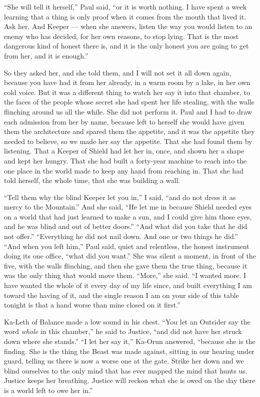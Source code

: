 ``She will tell it herself,'' Paul said, ``or it is worth nothing. I have spent a week learning that a thing is only proof when it comes from the mouth that lived it. Ask her. And Keeper --- when she answers, listen the way you would listen to an enemy who has decided, for her own reasons, to stop lying. That is the most dangerous kind of honest there is, and it is the only honest you are going to get from her, and it is enough.''\par

So they asked her, and she told them, and I will not set it all down again, because you have had it from her already, in a warm room by a lake, in her own cold voice. But it was a different thing to watch her say it into that chamber, to the faces of the people whose secret she had spent her life stealing, with the walls flinching around us all the while. She did not perform it. Paul and I had to draw each admission from her by name, because left to herself she would have given them the architecture and spared them the appetite, and it was the appetite they needed to believe, so we made her say the appetite. That she had found them by listening. That a Keeper of Shield had let her in, once, and shown her a shape and kept her hungry. That she had built a forty-year machine to reach into the one place in the world made to keep any hand from reaching in. That she had told herself, the whole time, that she was building a wall.\par

``Tell them why the blind Keeper let you in,'' I said, ``and do not dress it as mercy to the Mountain.'' And she said, ``He let me in because Shield needed eyes on a world that had just learned to make a sun, and I could give him those eyes, and he was blind and out of better doors.'' ``And what did you take that he did not offer.'' ``Everything he did not nail down. And one or two things he did.'' ``And when you left him,'' Paul said, quiet and relentless, the honest instrument doing its one office, ``what did you want.'' She was silent a moment, in front of the five, with the walls flinching, and then she gave them the true thing, because it was the only thing that would move them. ``More,'' she said. ``I wanted more. I have wanted the whole of it every day of my life since, and built everything I am toward the having of it, and the single reason I am on your side of this table tonight is that a hand worse than mine closed on it first.''\par

Ka-Leth of Balance made a low sound in his chest. ``You let an Outsider say the word \emph{whole} in this chamber,'' he said to Justice, ``and did not have her struck down where she stands.'' ``I let her say it,'' Ka-Orun answered, ``because she is the finding. She is the thing the Beast was made against, sitting in our hearing under guard, telling us there is now a worse one at the gate. Strike her down and we blind ourselves to the only mind that has ever mapped the mind that hunts us. Justice keeps her breathing. Justice will reckon what she is owed on the day there is a world left to owe her in.''\par

